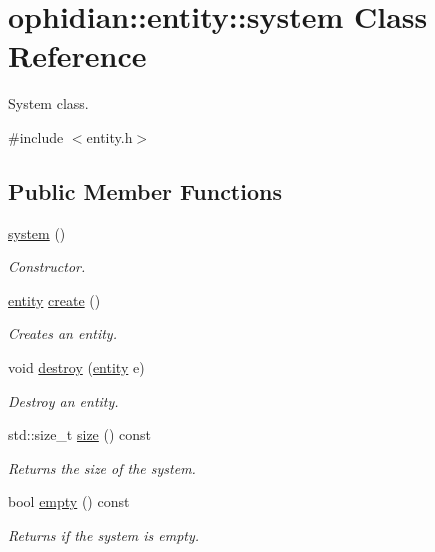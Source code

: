 \hypertarget{classophidian_1_1entity_1_1system}{\section{ophidian\-:\-:entity\-:\-:system Class Reference}
\label{classophidian_1_1entity_1_1system}
}


System class.  




{\ttfamily \#include $<$entity.\-h$>$}

\subsection*{Public Member Functions}
\begin{DoxyCompactItemize}
\item 
\hyperlink{classophidian_1_1entity_1_1system_ae0c31e9ba22d9d52fbd9a405b49afb27}{system} ()
\begin{DoxyCompactList}\small\item\em Constructor. \end{DoxyCompactList}\item 
\hyperlink{classophidian_1_1entity_1_1entity}{entity} \hyperlink{classophidian_1_1entity_1_1system_a4860ce43a8f6639e0fd4dc56fae07d1f}{create} ()
\begin{DoxyCompactList}\small\item\em Creates an entity. \end{DoxyCompactList}\item 
void \hyperlink{classophidian_1_1entity_1_1system_a7b61729df0d01e9c71d622f67dd09103}{destroy} (\hyperlink{classophidian_1_1entity_1_1entity}{entity} e)
\begin{DoxyCompactList}\small\item\em Destroy an entity. \end{DoxyCompactList}\item 
std\-::size\-\_\-t \hyperlink{classophidian_1_1entity_1_1system_a71cc15925a15ecb74e15dc55b1a39549}{size} () const 
\begin{DoxyCompactList}\small\item\em Returns the size of the system. \end{DoxyCompactList}\item 
bool \hyperlink{classophidian_1_1entity_1_1system_a200d96480d9fc4209013de90f58715e9}{empty} () const 
\begin{DoxyCompactList}\small\item\em Returns if the system is empty. \end{DoxyCompactList}\item 

\end{DoxyCompactItemize}
